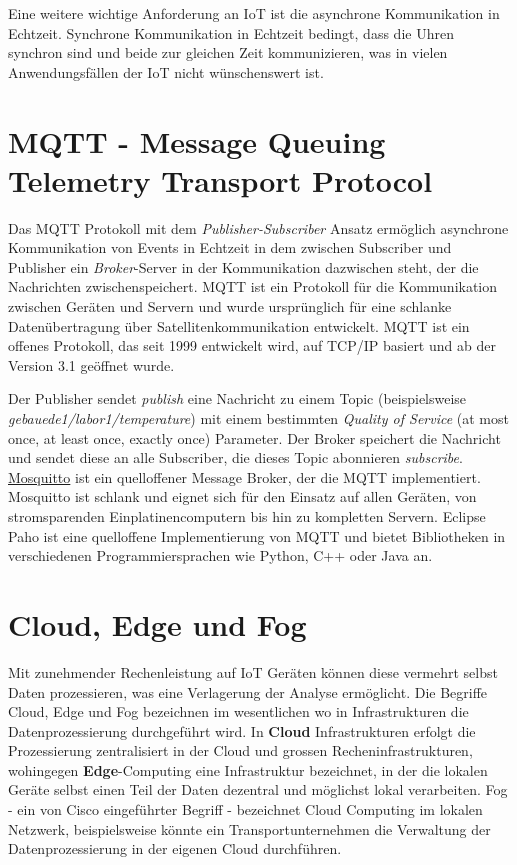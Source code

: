 \documentclass[
  11pt,
  a4paperpaper,
  oneside, openany  ,captions=tableheading
]{scrbook}
\theoremstyle{definition}
\theoremstyle{remark}
\begin{document}
Eine weitere wichtige Anforderung an IoT ist die asynchrone
Kommunikation in Echtzeit. Synchrone Kommunikation in Echtzeit bedingt,
dass die Uhren synchron sind und beide zur gleichen Zeit kommunizieren,
was in vielen Anwendungsfällen der IoT nicht wünschenswert ist.

\section{MQTT - Message Queuing Telemetry Transport
Protocol}\label{mqtt---message-queuing-telemetry-transport-protocol}

Das MQTT Protokoll mit dem \emph{Publisher-Subscriber} Ansatz ermöglich
asynchrone Kommunikation von Events in Echtzeit in dem zwischen
Subscriber und Publisher ein \emph{Broker}-Server in der Kommunikation
dazwischen steht, der die Nachrichten zwischenspeichert. MQTT ist ein
Protokoll für die Kommunikation zwischen Geräten und Servern und wurde
ursprünglich für eine schlanke Datenübertragung über
Satellitenkommunikation entwickelt. MQTT ist ein offenes Protokoll, das
seit 1999 entwickelt wird, auf TCP/IP basiert und ab der Version 3.1
geöffnet wurde.

Der Publisher sendet \emph{publish} eine Nachricht zu einem Topic
(beispielsweise \emph{gebauede1/labor1/temperature}) mit einem
bestimmten \emph{Quality of Service} (at most once, at least once,
exactly once) Parameter. Der Broker speichert die Nachricht und sendet
diese an alle Subscriber, die dieses Topic abonnieren \emph{subscribe}.
\href{https://mosquitto.org}{Mosquitto} ist ein quelloffener Message
Broker, der die MQTT implementiert. Mosquitto ist schlank und eignet
sich für den Einsatz auf allen Geräten, von stromsparenden
Einplatinencomputern bis hin zu kompletten Servern. Eclipse Paho ist
eine quelloffene Implementierung von MQTT und bietet Bibliotheken in
verschiedenen Programmiersprachen wie Python, C++ oder Java an.

\section{Cloud, Edge und Fog}\label{cloud-edge-und-fog}

Mit zunehmender Rechenleistung auf IoT Geräten können diese vermehrt
selbst Daten prozessieren, was eine Verlagerung der Analyse ermöglicht.
Die Begriffe Cloud, Edge und Fog bezeichnen im wesentlichen wo in
Infrastrukturen die Datenprozessierung durchgeführt wird. In
\textbf{Cloud} Infrastrukturen erfolgt die Prozessierung zentralisiert
in der Cloud und grossen Recheninfrastrukturen, wohingegen
\textbf{Edge}-Computing eine Infrastruktur bezeichnet, in der die
lokalen Geräte selbst einen Teil der Daten dezentral und möglichst lokal
verarbeiten. Fog - ein von Cisco eingeführter Begriff - bezeichnet Cloud
Computing im lokalen Netzwerk, beispielsweise könnte ein
Transportunternehmen die Verwaltung der Datenprozessierung in der
eigenen Cloud durchführen.
\end{document}
